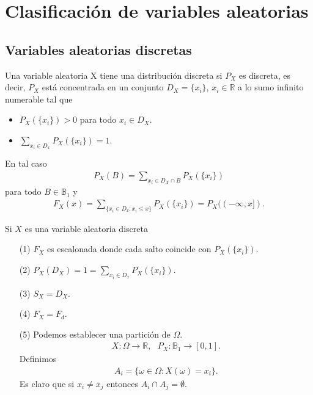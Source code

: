 \chapter{Clasificación de variables aleatorias}

\section{Variables aleatorias discretas}
\begin{defi}
    Una variable aleatoria X tiene una distribución discreta si $P_X$ es discreta, es decir, $P_X$ está concentrada en un conjunto $D_X = \{x_i\}$, $x_i \in \mathbb{R}$ a lo sumo infinito numerable tal que
    \begin{itemize}
        \item $P_X(\{x_i\}) > 0$ para todo $x_i \in D_X$.
        \item $\sum_{x_i \in D_x}{P_X(\{x_i\})} = 1$.
    \end{itemize}
    En tal caso
    \begin{align*}
        P_X(B) = \sum_{x_i \in D_X \cap B}{P_X(\{x_i\})}
    \end{align*}
    para todo $B \in \mathbb{B}_1$ y
    \begin{align*}
        F_X(x) = \sum_{\{x_i \in D_x : x_i \leq x \}}{P_X(\{x_i\})} = P_X((-\infty,x]).
    \end{align*}
\end{defi}

\begin{obs}
    Si $X$ es una variable aleatoria discreta
    \begin{enumerate}
        \item[(1)] $F_X$ es escalonada donde cada salto coincide con $P_X(\{x_i\})$.
        \item[(2)] $P_X(D_X) = 1 = \sum_{x_i \in D_x}{P_X(\{x_i\})}$.
        \item[(3)] $S_X = D_X$.
        \item[(4)] $F_X = F_d$.
        \item[(5)] Podemos establecer una partición de $\Omega$.
              \begin{align*}
                  X: \Omega \longrightarrow \mathbb{R}, \ \ \ P_X: \mathbb{B}_1 \longrightarrow [0,1].
              \end{align*}
              Definimos
              \begin{align*}
                  A_i = \{ \omega \in \Omega : X(\omega) = x_i \}.
              \end{align*}
              Es claro que si $x_i \not = x_j$ entonces $A_i \cap A_j = \emptyset$.
    \end{enumerate}
\end{obs}


